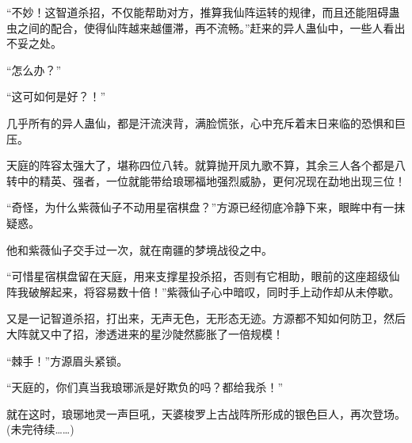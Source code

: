 \begin{this_body}
“不妙！这智道杀招，不仅能帮助对方，推算我仙阵运转的规律，而且还能阻碍蛊虫之间的配合，使得仙阵越来越僵滞，再不流畅。”赶来的异人蛊仙中，一些人看出不妥之处。

“怎么办？”

“这可如何是好？！”

几乎所有的异人蛊仙，都是汗流浃背，满脸慌张，心中充斥着末日来临的恐惧和巨压。

天庭的阵容太强大了，堪称四位八转。就算抛开凤九歌不算，其余三人各个都是八转中的精英、强者，一位就能带给琅琊福地强烈威胁，更何况现在勐地出现三位！

“奇怪，为什么紫薇仙子不动用星宿棋盘？”方源已经彻底冷静下来，眼眸中有一抹疑惑。

他和紫薇仙子交手过一次，就在南疆的梦境战役之中。

“可惜星宿棋盘留在天庭，用来支撑星投杀招，否则有它相助，眼前的这座超级仙阵我破解起来，将容易数十倍！”紫薇仙子心中暗叹，同时手上动作却从未停歇。

又是一记智道杀招，打出来，无声无色，无形态无迹。方源都不知如何防卫，然后大阵就又中了招，渗透进来的星沙陡然膨胀了一倍规模！

“棘手！”方源眉头紧锁。

“天庭的，你们真当我琅琊派是好欺负的吗？都给我杀！”

就在这时，琅琊地灵一声巨吼，天婆梭罗上古战阵所形成的银色巨人，再次登场。(未完待续……)

\end{this_body}

